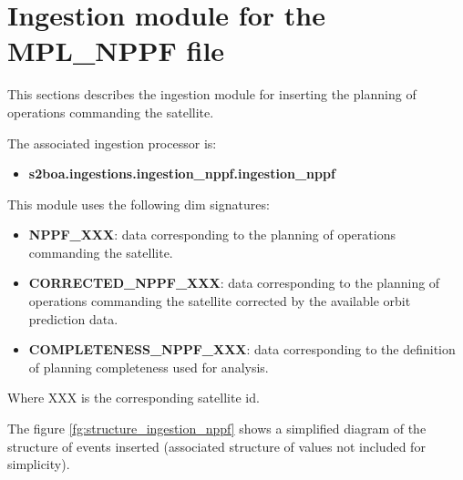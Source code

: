 \section{Ingestion module for the MPL\_NPPF file}

This sections describes the ingestion module for inserting the planning of operations commanding the satellite.

The associated ingestion processor is:

\begin{itemize} 

\item \textbf{s2boa.ingestions.ingestion\_nppf.ingestion\_nppf}
  
\end{itemize}

This module uses the following \acrshort{dim} signatures:

\begin{itemize} 

\item \textbf{NPPF\_XXX}: data corresponding to the planning of operations commanding the satellite.

\item \textbf{CORRECTED\_NPPF\_XXX}: data corresponding to the planning of operations commanding the satellite corrected by the available orbit prediction data.

\item \textbf{COMPLETENESS\_NPPF\_XXX}: data corresponding to the definition of planning completeness used for analysis.
  
\end{itemize}

Where XXX is the corresponding satellite id.

The figure \ref{fg:structure_ingestion_nppf} shows a simplified diagram of the structure of events inserted (associated structure of values not included for simplicity).

